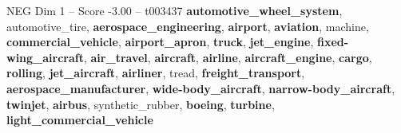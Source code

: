 \begin{textsample}{NEG Dim 1 – Score -3.00 – t003437}  \label{ex:f1_neg_023}
\textbf{automotive\_wheel\_system}, automotive\_tire, \textbf{aerospace\_engineering}, \textbf{airport}, \textbf{aviation}, machine, \textbf{commercial\_vehicle}, \textbf{airport\_apron}, \textbf{truck}, \textbf{jet\_engine}, \textbf{fixed-wing\_aircraft}, \textbf{air\_travel}, \textbf{aircraft}, \textbf{airline}, \textbf{aircraft\_engine}, \textbf{cargo}, \textbf{rolling}, \textbf{jet\_aircraft}, \textbf{airliner}, tread, \textbf{freight\_transport}, \textbf{aerospace\_manufacturer}, \textbf{wide-body\_aircraft}, \textbf{narrow-body\_aircraft}, \textbf{twinjet}, \textbf{airbus}, synthetic\_rubber, \textbf{boeing}, \textbf{turbine}, \textbf{light\_commercial\_vehicle}

\end{textsample}
